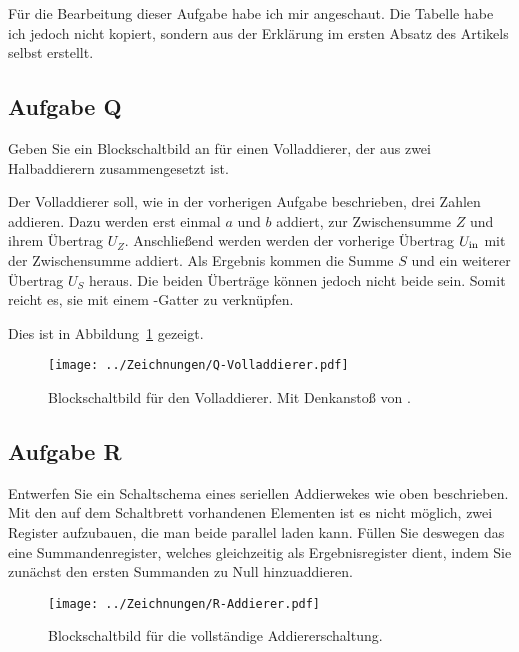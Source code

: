 \begin{small}
	Für die Bearbeitung dieser Aufgabe habe ich mir
	\cite{wikipedia/Volladdierer} angeschaut. Die Tabelle habe ich jedoch nicht
	kopiert, sondern aus der Erklärung im ersten Absatz des Artikels selbst
	erstellt.
\end{small}

\FloatBarrier
\subsection{Aufgabe Q}

\begin{problem}
	Geben Sie ein Blockschaltbild an für einen Volladdierer, der aus zwei
	Halbaddierern zusammengesetzt ist.
\end{problem}

Der Volladdierer soll, wie in der vorherigen Aufgabe beschrieben, drei Zahlen
addieren. Dazu werden erst einmal $a$ und $b$ addiert, zur Zwischensumme $Z$
und ihrem Übertrag $U_Z$. Anschließend werden werden der vorherige Übertrag
$U_\text{in}$ mit der Zwischensumme addiert. Als Ergebnis kommen die Summe $S$ und ein
weiterer Übertrag $U_S$ heraus. Die beiden Überträge können jedoch nicht beide
\thigh{} sein. Somit reicht es, sie mit einem \tor-Gatter zu verknüpfen.

Dies ist in Abbildung~\ref{fig:Q-Volladdierer} gezeigt.

\begin{figure}[htbp]
	\centering
	\texttt{[image: ../Zeichnungen/Q-Volladdierer.pdf]}
	\caption{%
		Blockschaltbild für den Volladdierer. Mit Denkanstoß von
		\cite{wikipedia/Volladdierer}.
	}
	\label{fig:Q-Volladdierer}
\end{figure}

\FloatBarrier
\subsection{Aufgabe R}

\begin{problem}
	Entwerfen Sie ein Schaltschema eines seriellen Addierwekes wie oben
	beschrieben. Mit den auf dem Schaltbrett vorhandenen Elementen ist es nicht
	möglich, zwei Register aufzubauen, die man beide parallel laden kann.
	Füllen Sie deswegen das eine Summandenregister, welches gleichzeitig als
	Ergebnisregister dient, indem Sie zunächst den ersten Summanden zu Null
	hinzuaddieren.
\end{problem}

\begin{figure}[htbp]
	\centering
	\texttt{[image: ../Zeichnungen/R-Addierer.pdf]}
	\caption{%
		Blockschaltbild für die vollständige Addiererschaltung.
	}
	\label{fig:R-Addierer}
\end{figure}

